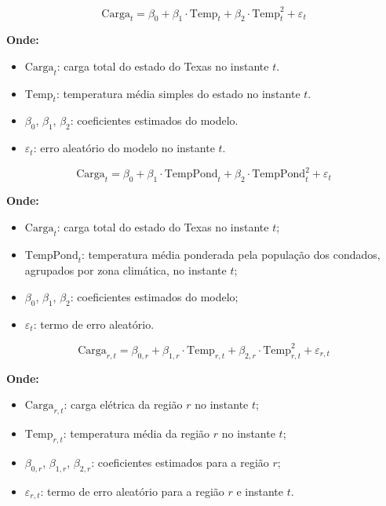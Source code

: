 \documentclass{article}
\begin{document}
\begin{equation}
    \text{Carga}_{t} = \beta_0 + \beta_1 \cdot \text{Temp}_{t} + \beta_2 \cdot \text{Temp}_{t}^2 + \varepsilon_t
    \end{equation}
    
    \begin{flushleft}
    \textbf{Onde:}
    \begin{itemize}
        \item $\text{Carga}_{t}$: carga total do estado do Texas no instante $t$.
        \item $\text{Temp}_{t}$: temperatura média simples do estado no instante $t$.
        \item $\beta_0$, $\beta_1$, $\beta_2$: coeficientes estimados do modelo.
        \item $\varepsilon_t$: erro aleatório do modelo no instante $t$.
    \end{itemize}
    \end{flushleft}



\begin{equation}
    \text{Carga}_{t} = \beta_0 + \beta_1 \cdot \text{TempPond}_{t} + \beta_2 \cdot \text{TempPond}_{t}^2 + \varepsilon_t
    \end{equation}
    
    \begin{flushleft}
    \textbf{Onde:}
    \begin{itemize}
        \item $\text{Carga}_{t}$: carga total do estado do Texas no instante $t$;
        \item $\text{TempPond}_{t}$: temperatura média ponderada pela população dos condados, agrupados por zona climática, no instante $t$;
        \item $\beta_0$, $\beta_1$, $\beta_2$: coeficientes estimados do modelo;
        \item $\varepsilon_t$: termo de erro aleatório.
    \end{itemize}
    \end{flushleft}


\begin{equation}
    \text{Carga}_{r,t} = \beta_{0,r} + \beta_{1,r} \cdot \text{Temp}_{r,t} + \beta_{2,r} \cdot \text{Temp}_{r,t}^2 + \varepsilon_{r,t}
    \end{equation}
    
    \begin{flushleft}
    \textbf{Onde:}
    \begin{itemize}
        \item $\text{Carga}_{r,t}$: carga elétrica da região $r$ no instante $t$;
        \item $\text{Temp}_{r,t}$: temperatura média da região $r$ no instante $t$;
        \item $\beta_{0,r}$, $\beta_{1,r}$, $\beta_{2,r}$: coeficientes estimados para a região $r$;
        \item $\varepsilon_{r,t}$: termo de erro aleatório para a região $r$ e instante $t$.
    \end{itemize}
    \end{flushleft}
\end{document}
